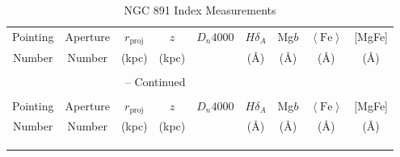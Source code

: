\begin{landscape}
\begin{longtable}{ccccccccc}
\caption{NGC 891 Index Measurements} \label{tab:index_res_full} \\
Pointing &
Aperture &
$r_\mathrm{proj}$ &
$z$ &
$D_n4000$ &
$H\delta_A$ &
Mg$b$ &
$\left<\mathrm{Fe}\right>$ &
[MgFe] \\
Number &
Number &
(kpc) &
(kpc) &
 &
(\AA) &
(\AA) &
(\AA) &
(\AA) \\[0.5ex] \hline
\\[-1.8ex]
\endfirsthead

\multicolumn{7}{c}{{\tablename} \thetable{} -- Continued} \\[0.5ex]
\hline \hline \\[-2ex]
Pointing &
Aperture &
$r_\mathrm{proj}$ &
$z$ &
$D_n4000$ &
$H\delta_A$ &
Mg$b$ &
$\left<\mathrm{Fe}\right>$ &
[MgFe] \\
Number &
Number &
(kpc) &
(kpc) &
 &
(\AA) &
(\AA) &
(\AA) &
(\AA) \\[0.5ex] \hline
\\[-1.8ex]
\endhead

\endfoot

\\[-1.8ex] \hline \hline
\endlastfoot


\end{longtable}
\end{landscape}
